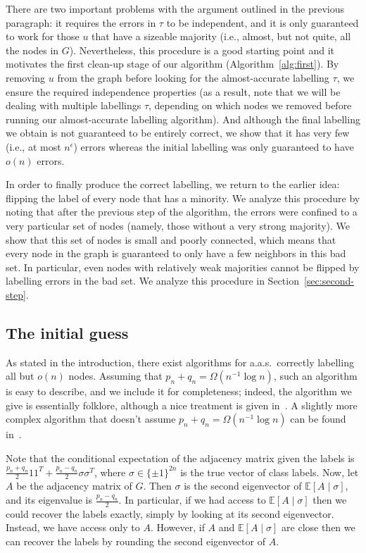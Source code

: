 \documentclass[EJP]{ejpecp}
\newcommand{\E}{\mathbb{E}}
\newcommand{\1}[1]{\mathbbm{1}_{\{#1\}}}
\begin{document}
There are two important problems with the argument outlined in the
previous paragraph: it requires the errors in $\tau$
to be independent, and it is only guaranteed to work
for those $u$ that have a sizeable majority (i.e., almost, but not quite,
all the nodes in $G$). Nevertheless, this procedure is a good starting
point and it motivates the first clean-up stage of our
algorithm (Algorithm~\ref{alg:first}). By removing
$u$ from the graph before looking for the almost-accurate labelling $\tau$,
we ensure the required independence properties
(as a result, note that we will be dealing with multiple labellings $\tau$,
depending on which nodes we removed before running our almost-accurate labelling
algorithm). And although the final
labelling we obtain is not guaranteed to be entirely correct, we show
that it has very few (i.e., at most $n^\epsilon$) errors whereas
the initial labelling was only guaranteed to have $o(n)$ errors.

In order to finally produce the correct labelling, we
return to the earlier idea: flipping the label of every node
that has a minority. We analyze this procedure by noting that
after the previous step of the algorithm, the errors were confined to
a very particular set of nodes (namely, those without a very strong majority).
We show that this set of nodes is small and poorly connected, which
means that every node in the graph is guaranteed to only have a few neighbors
in this bad set. In particular, even nodes with relatively weak majorities
cannot be flipped by labelling errors in the bad set.
We analyze this procedure in Section~\ref{sec:second-step}.


\subsection{The initial guess}\label{sec:spectral}

As stated in the introduction,
there exist algorithms for a.a.s.\ correctly labelling all but
$o(n)$ nodes. Assuming that $p_n + q_n = \Omega(n^{-1} \log n)$, such
an algorithm is easy to describe, and we include it for completeness;
indeed, the algorithm we give is essentially
folklore, although a nice treatment is given in~\cite{NadakuditiNewman:12}.
A slightly more complex algorithm that doesn't assume
$p_n + q_n = \Omega(n^{-1} \log n)$ can be found in~\cite{YunProutiere:14}.

Note that the conditional expectation
of the adjacency matrix given the labels is $\frac{p_n + q_n}{2} 1 1^T + \frac{p_n - q_n}{2} \sigma \sigma^T$,
where $\sigma \in \{\pm 1\}^{2n}$ is the true vector of class labels.
Now, let $A$ be the adjacency matrix of $G$. Then $\sigma$ is the second eigenvector of $\E [A \mid \sigma]$,
and its eigenvalue is $\frac{p_n - q_n}{2}$. In particular, if we had access to $\E [A \mid \sigma]$ then
we could recover the labels exactly, simply by looking at its second eigenvector.
Instead, we have access only to $A$. However, if $A$ and $\E[A \mid \sigma]$ are close then
we can recover the labels by rounding the second eigenvector of $A$.
\end{document}
